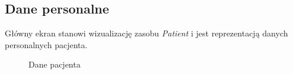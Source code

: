 \documentclass[a4paper]{article}
\begin{document}
\subsection{Dane personalne}
Główny ekran stanowi wizualizację zasobu \textit{Patient} i jest reprezentacją danych personalnych pacjenta.
\begin{figure}[H]
    \caption{Dane pacjenta}
\end{figure}

\pagebreak
\end{document}
